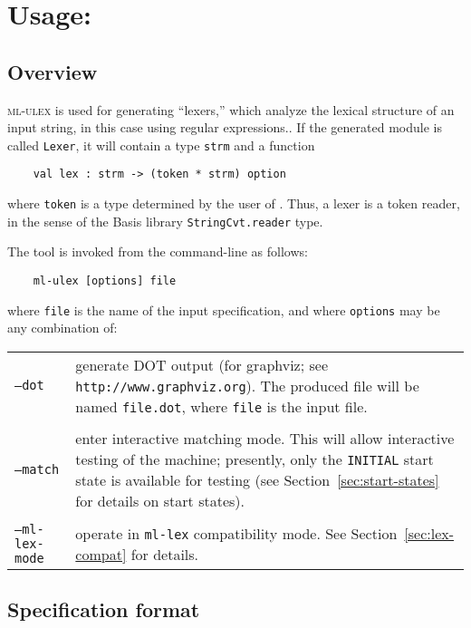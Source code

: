 \chapter[\ulex]{Usage: \ulex}

\section{Overview}

\textsc{ml-ulex} is used for generating ``lexers,'' which analyze the lexical structure of an input string, in this case using regular expressions..  If the generated module is called {\tt Lexer}, it will contain a type {\tt strm} and a function
\begin{verbatim}
    val lex : strm -> (token * strm) option
\end{verbatim}
where {\tt token} is a type determined by the user of \ulex{}.  Thus, a lexer is a token reader, in the sense of the Basis library {\tt StringCvt.reader} type.

The tool is invoked from the command-line as follows:
\begin{verbatim}
    ml-ulex [options] file
\end{verbatim}
where {\tt file} is the name of the input \ulex{} specification, and where {\tt options} may be any combination of:

\vskip 12pt
\begin{tabular}{lp{}}
  {\tt --dot} & generate DOT output (for graphviz; see \texttt{http://www.graphviz.org}).  The produced file will be named {\tt file.dot}, where {\tt file} is the input file. \\
  \\
  {\tt --match} & enter interactive matching mode.  This will allow interactive testing of the machine; presently, only the {\tt INITIAL} start state is available for testing (see Section~\ref{sec:start-states} for details on start states).  \\
  \\
  {\tt --ml-lex-mode} & operate in {\tt ml-lex} compatibility mode.  See Section~\ref{sec:lex-compat} for details.
\end{tabular}

\section{Specification format}

